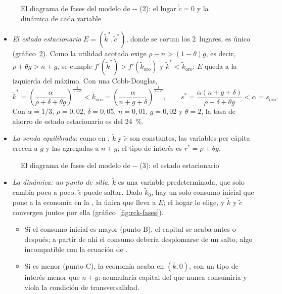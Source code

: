 \documentclass[11pt]{article}
\begin{document}
\begin{figure}[H]
\centering
\caption{El diagrama de fases del modelo de -- (2): el lugar $\dot{\tilde c}=0$ y la dinámica de cada variable}\label{fig:rck-fases-paso2}
\end{figure}

\begin{itemize}
\item \emph{El estado estacionario} $E=(\tilde k^*,\tilde c^*)$, donde se cortan los 2~lugares, es único (gráfico~\ref{fig:rck-fases-paso3}). Como la utilidad acotada exige $\rho-n>(1-\theta)g$, es decir, $\rho+\theta g>n+g$, se cumple $f'(\tilde k^*)>f'(\tilde k_{\mathrm{oro}})$ y $\tilde k^*<\tilde k_{\mathrm{oro}}$: $E$ queda a la izquierda del máximo. Con una Cobb-Douglas,
  \[\tilde k^*=\left(\frac{\alpha}{\rho+\delta+\theta g}\right)^{\frac{1}{1-\alpha}}<\tilde k_{\mathrm{oro}}=\left(\frac{\alpha}{n+g+\delta}\right)^{\frac{1}{1-\alpha}},\qquad s^*=\frac{\alpha(n+g+\delta)}{\rho+\delta+\theta g}<\alpha=s_{\mathrm{oro}}.\]
  Con $\alpha=1/3$, $\rho=0{,}02$, $\delta=0{,}05$, $n=0{,}01$, $g=0{,}02$ y $\theta=2$, la tasa de ahorro de estado estacionario es del 24~\%.
\item \emph{La senda equilibrada}: como en , $\tilde k$ y $\tilde c$ son constantes, las variables per cápita crecen a $g$ y las agregadas a $n+g$; el tipo de interés es $r^*=\rho+\theta g$.
\end{itemize}

\begin{figure}[H]
\centering
\caption{El diagrama de fases del modelo de -- (3): el estado estacionario}\label{fig:rck-fases-paso3}
\end{figure}

\begin{itemize}
\item \emph{La dinámica: un punto de silla}. $\tilde k$ es una variable predeterminada, que solo cambia poco a poco; $\tilde c$ puede saltar. Dado $\tilde k_0$, hay un solo consumo inicial que pone a la economía en la , la única que lleva a $E$; el hogar lo elige, y $\tilde k$ y $\tilde c$ convergen juntos por ella (gráfico~\ref{fig:rck-fases}).
  \begin{itemize}
  \item Si el consumo inicial es mayor (punto B), el capital se acaba antes o después; a partir de ahí el consumo debería desplomarse de un salto, algo incompatible con la ecuación de .
  \item Si es menor (punto C), la economía acaba en $(\bar k,0)$, con un tipo de interés menor que $n+g$: acumularía capital del que nunca consumiría y viola la condición de transversalidad.
  \end{itemize}
\end{itemize}
\end{document}

